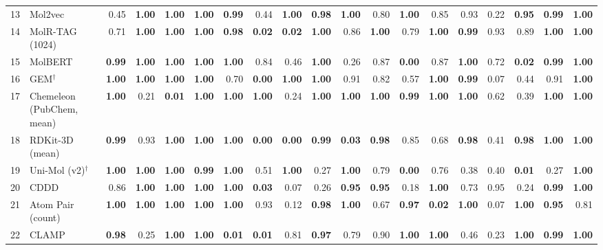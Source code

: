 \documentclass{article}
\begin{document}
\begin{table}[H]
{\begin{tabular}{@{}rlrrrrrrrrrrrrrrrrr@{}}
13 & Mol2vec & 0.45 & \textbf{1.00} & \textbf{1.00} & \textbf{1.00} & \textbf{0.99} & 0.44 & \textbf{1.00} & \textbf{0.98} & \textbf{1.00} & 0.80 & \textbf{1.00} & 0.85 & 0.93 & 0.22 & \textbf{0.95} & \textbf{0.99} & \textbf{1.00} \\
14 & MolR-TAG (1024) & 0.71 & \textbf{1.00} & \textbf{1.00} & \textbf{1.00} & \textbf{0.98} & \textbf{0.02} & \textbf{0.02} & \textbf{1.00} & 0.86 & \textbf{1.00} & 0.79 & \textbf{1.00} & \textbf{0.99} & 0.93 & 0.89 & \textbf{1.00} & \textbf{1.00} \\
15 & MolBERT & \textbf{0.99} & \textbf{1.00} & \textbf{1.00} & \textbf{1.00} & \textbf{1.00} & 0.84 & 0.46 & \textbf{1.00} & 0.26 & 0.87 & \textbf{0.00} & 0.87 & \textbf{1.00} & 0.72 & \textbf{0.02} & \textbf{0.99} & \textbf{1.00} \\
16 & GEM$^\dagger$ & \textbf{1.00} & \textbf{1.00} & \textbf{1.00} & \textbf{1.00} & 0.70 & \textbf{0.00} & \textbf{1.00} & \textbf{1.00} & 0.91 & 0.82 & 0.57 & \textbf{1.00} & \textbf{0.99} & 0.07 & 0.44 & 0.91 & \textbf{1.00} \\
17 & Chemeleon (PubChem, mean) & \textbf{1.00} & 0.21 & \textbf{0.01} & \textbf{1.00} & \textbf{1.00} & \textbf{1.00} & 0.24 & \textbf{1.00} & \textbf{1.00} & \textbf{1.00} & \textbf{0.99} & \textbf{1.00} & \textbf{1.00} & 0.62 & 0.39 & \textbf{1.00} & \textbf{1.00} \\
18 & RDKit-3D (mean) & \textbf{0.99} & 0.93 & \textbf{1.00} & \textbf{1.00} & \textbf{1.00} & \textbf{0.00} & \textbf{0.00} & \textbf{0.99} & \textbf{0.03} & \textbf{0.98} & 0.85 & 0.68 & \textbf{0.98} & 0.41 & \textbf{0.98} & \textbf{1.00} & \textbf{1.00} \\
19 & Uni-Mol (v2)$^\dagger$ & \textbf{1.00} & \textbf{1.00} & \textbf{1.00} & \textbf{0.99} & \textbf{1.00} & 0.51 & \textbf{1.00} & 0.27 & \textbf{1.00} & 0.79 & \textbf{0.00} & 0.76 & 0.38 & 0.40 & \textbf{0.01} & 0.27 & \textbf{1.00} \\
20 & CDDD & 0.86 & \textbf{1.00} & \textbf{1.00} & \textbf{1.00} & \textbf{1.00} & \textbf{0.03} & 0.07 & 0.26 & \textbf{0.95} & \textbf{0.95} & 0.18 & \textbf{1.00} & 0.73 & 0.95 & 0.24 & \textbf{0.99} & \textbf{1.00} \\
21 & Atom Pair (count) & \textbf{1.00} & \textbf{1.00} & \textbf{1.00} & \textbf{1.00} & \textbf{1.00} & 0.93 & 0.12 & \textbf{0.98} & \textbf{1.00} & 0.67 & \textbf{0.97} & \textbf{0.02} & \textbf{1.00} & 0.07 & \textbf{1.00} & \textbf{0.95} & 0.81 \\
22 & CLAMP & \textbf{0.98} & 0.25 & \textbf{1.00} & \textbf{1.00} & \textbf{0.01} & \textbf{0.01} & 0.81 & \textbf{0.97} & 0.79 & 0.90 & \textbf{1.00} & \textbf{1.00} & 0.46 & 0.23 & \textbf{1.00} & \textbf{0.99} & \textbf{1.00} \\

\end{tabular}}
\end{table}
\end{document}
